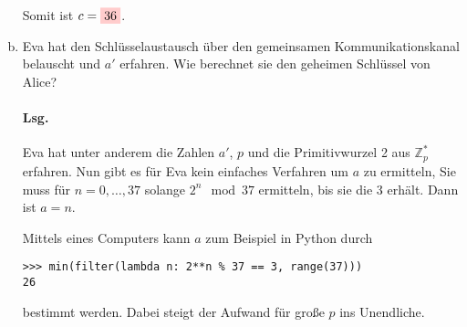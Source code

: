 \documentclass{scrreprt}
\begin{document}
\begin{enumerate}[(a)]
  Somit ist $c = \colorbox{red!20}{$36$}$.

\item Eva hat den Schlüsselaustausch über den gemeinsamen Kommunikationskanal
  belauscht und $a'$ erfahren.
  Wie berechnet sie den geheimen Schlüssel von Alice?

  \paragraph{Lsg.} Eva hat unter anderem die Zahlen $a'$, $p$ und die
  Primitivwurzel 2 aus $\mathbb{Z}_p^*$ erfahren.
  Nun gibt es für Eva kein einfaches Verfahren um $a$ zu ermitteln,
  Sie muss für $n = 0, \ldots, 37$ solange $2^n \mod 37$ ermitteln, bis
  sie die 3 erhält.
  Dann ist $a = n$.

  Mittels eines Computers kann $a$ zum Beispiel in Python durch
\begin{lstlisting}
>>> min(filter(lambda n: 2**n % 37 == 3, range(37)))
26
\end{lstlisting}
  bestimmt werden.
  Dabei steigt der Aufwand für große $p$ ins Unendliche.
\end{enumerate}
\end{document}

